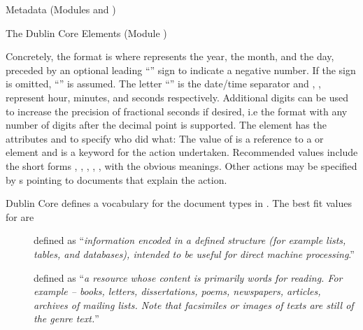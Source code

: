 \begin{tchapter}[id=metadata,short=Metadata]{Metadata (Modules {} and  {})}
\begin{tsection}[id=dc-elements]{The Dublin Core Elements (Module {})}
\begin{description}
  Concretely, the format is
  {}
  where {} represents the year, {} the month, and {}
  the day, preceded by an optional leading ``{\snippet{-}}'' sign to indicate a negative
  number. If the sign is omitted, ``{\snippet{+}}'' is assumed.  The letter
  ``{}'' is the date/time separator and {}, {},
  {} represent hour, minutes, and seconds respectively.  Additional digits can
  be used to increase the precision of fractional seconds if desired, i.e the format
  {} with any number of digits after the decimal
  point is supported.  The {} element has the attributes
  {} and {} to specify
  who did what: The value of {} is a reference to a
  {} or {} element and
   is a keyword for the action
  undertaken. Recommended values include the short forms
  {},
  {},
  {},
  {},
  {},
  {} with the obvious meanings. Other actions may
  be specified by {s} pointing to documents that explain the action.
\item[{\element[ns-elt=dc]{type}}] Dublin Core defines a vocabulary for the document types
  in {\cite{DCMI:dtv03}}. The best fit values for {\omdoc} are
  \begin{description}
  \item[{}]
    defined as ``{\emph{information encoded in a defined structure (for example lists,
      tables, and databases), intended to be useful for direct machine processing}}.''
  \item[{}] defined as
    ``{\emph{a resource whose content is primarily words for reading. For example -- books,
      letters, dissertations, poems, newspapers, articles, archives of mailing lists. Note
      that facsimiles or images of texts are still of the genre text.}}''

\end{description}
\end{description}
\end{tsection}
\end{tchapter}
